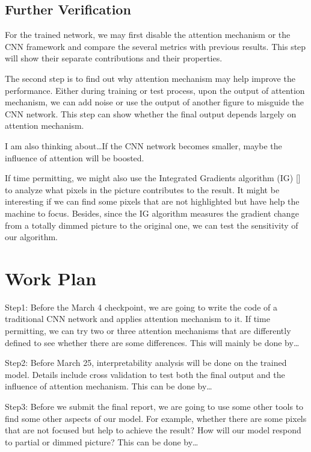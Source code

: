 \documentclass[12pt]{article}
\begin{document}
\subsection{Further Verification}
For the trained network, we may first disable the attention mechanism or the CNN framework and compare the several metrics with previous results. 
This step will show their separate contributions and their properties.

The second step is to find out why attention mechanism may help improve the performance. 
Either during training or test process, upon the output of attention mechanism, we can add noise or use the output of another figure to misguide the CNN network. 
This step can show whether the final output depends largely on attention mechanism.

I am also thinking about…If the CNN network becomes smaller, maybe the influence of attention will be boosted.

If time permitting, we might also use the Integrated Gradients algorithm (IG) [] to analyze what pixels in the picture contributes to the result. 
It might be interesting if we can find some pixels that are not highlighted but have help the machine to focus. 
Besides, since the IG algorithm measures the gradient change from a totally dimmed picture to the original one, we can test the sensitivity of our algorithm.

\section{Work Plan}
Step1: Before the March 4 checkpoint, we are going to write the code of a traditional CNN network and applies attention mechanism to it. 
If time permitting, we can try two or three attention mechanisms that are differently defined to see whether there are some differences. 
This will mainly be done by…

Step2: Before March 25, interpretability analysis will be done on the trained model. Details include cross validation to test both the final output and the influence of attention mechanism. 
This can be done by…

Step3: Before we submit the final report, we are going to use some other tools to find some other aspects of our model. 
For example, whether there are some pixels that are not focused but help to achieve the result? How will our model respond to partial or dimmed picture? This can be done by…

\newpage




\end{document}
